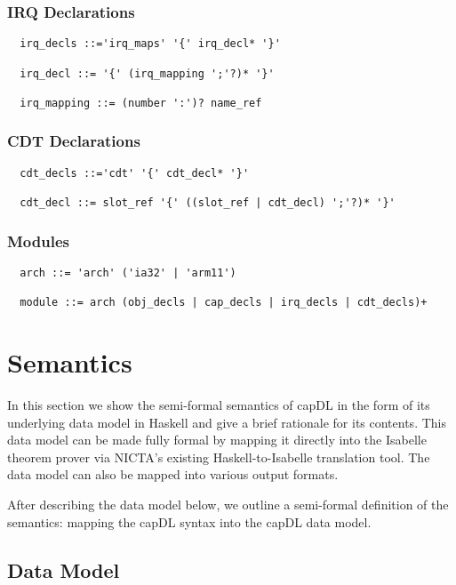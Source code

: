 \documentclass[a4paper,11pt]{article}
\begin{document}
\subsubsection{IRQ Declarations}

\begin{verbatim}
  irq_decls ::='irq_maps' '{' irq_decl* '}'

  irq_decl ::= '{' (irq_mapping ';'?)* '}'

  irq_mapping ::= (number ':')? name_ref
\end{verbatim}


\subsubsection{CDT Declarations}

\begin{verbatim}
  cdt_decls ::='cdt' '{' cdt_decl* '}'

  cdt_decl ::= slot_ref '{' ((slot_ref | cdt_decl) ';'?)* '}'
\end{verbatim}


\subsubsection{Modules}\label{sec:capDL:syntax:module}

\begin{verbatim}
  arch ::= 'arch' ('ia32' | 'arm11') 

  module ::= arch (obj_decls | cap_decls | irq_decls | cdt_decls)+
\end{verbatim}


\section{Semantics}
\label{sec:capDL:semantics}

In this section we show the semi-formal semantics of capDL in the form of its underlying data model in Haskell and give a brief rationale for its contents. This data model can be made fully formal by mapping it directly into the Isabelle theorem prover via NICTA's existing Haskell-to-Isabelle translation tool. The data model can also be mapped into various output formats. 

After describing the data model below, we outline a semi-formal definition of the semantics: mapping the capDL syntax into the capDL data model.


\subsection{Data Model}
\end{document}
